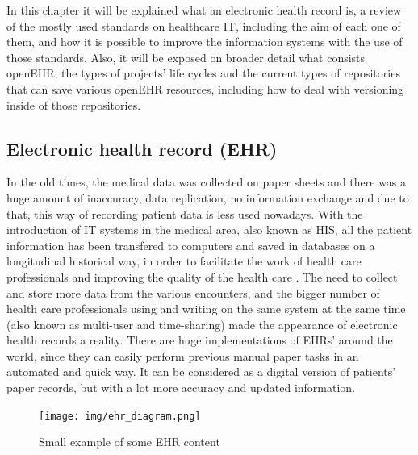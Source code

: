 \documentclass[mim_thesis.tex]{subfiles}
\begin{document}
In this chapter it will be explained what an electronic health record is, a review of the mostly used standards on healthcare \ac{IT}, including the aim of each one of them, and how it is possible to improve the information systems with the use of those standards. Also, it will be exposed on broader detail what consists openEHR, the types of projects’ life cycles and the current types of repositories that can save various openEHR resources, including how to deal with versioning inside of those repositories.

\subsection{Electronic health record (EHR)}
 
In the old times, the medical data was collected on paper sheets and there was a huge amount of inaccuracy, data replication, no information exchange and due to that, this way of recording patient data is less used nowadays. With the introduction of IT systems in the medical area, also known as \ac{HIS}, all the patient information has been transfered to computers and saved in databases on a longitudinal historical way, in order to facilitate the work of health care professionals and improving the quality of the health care \citep{wilcox2014software}. The need to collect and store more data from the various encounters, and the bigger number of health care professionals using and writing on the same system at the same time (also known as multi-user and time-sharing) made the appearance of electronic health records a reality. There are huge implementations of EHRs' around the world, since they can easily perform previous manual paper tasks in an automated and quick way. It can be considered as a digital version of patients' paper records, but with a lot more accuracy and updated information.
% 
% 
% 
% 

\begin{figure}[H]
	\centering
    \texttt{[image: img/ehr\_diagram.png]}
	\caption{ Small example of some EHR content}
	\label{fig:ehr_diagram}
\end{figure}
\end{document}
